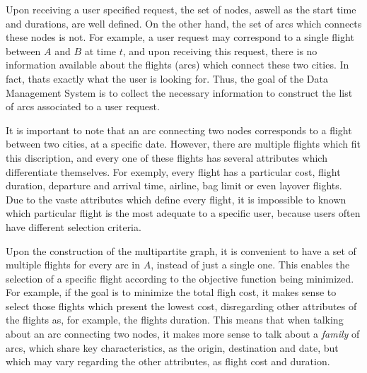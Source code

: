 
Upon receiving a user specified request, the set of nodes, aswell as the start time and durations,
are well defined. On the other hand, the set of arcs which connects these nodes is not.
For example, a user request may correspond to a single flight between $A$ and $B$ at time $t$,
and upon receiving this request, there is no information available about the flights (arcs)
which connect these two cities. In fact, thats exactly what the user is looking for.
Thus, the goal of the Data Management System is to collect the necessary information 
to construct the list of arcs associated to a user request.

It is important to note that an arc connecting two nodes corresponds 
to a flight between two cities, at a specific date. However, there are multiple 
flights which fit this discription, and every one of these flights has several attributes 
which differentiate themselves. For exemply, every flight has a particular cost,
flight duration, departure and arrival time, airline, bag limit or even 
layover flights.
Due to the vaste attributes which define every flight,
it is impossible to known which particular flight is the most adequate to a specific user,
because users often have different selection criteria.

Upon the construction of the multipartite graph,
it is convenient to have a set of multiple flights for every arc in $A$,
instead of just a single one.
This enables the selection of a specific flight according to the objective function being minimized.
For example, if the goal is to minimize the total fligh cost,
it makes sense to select those flights which present the lowest cost, 
disregarding other attributes of the flights as, for example, the flights duration.
This means that when talking about an arc connecting two nodes, it makes more sense to talk about 
a \textit{family} of arcs, which share key characteristics, as the origin, destination and date,
but which may vary regarding the other attributes, as flight cost and duration.


